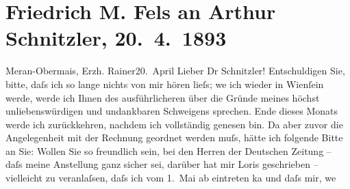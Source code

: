

               \section[Friedrich M. Fels an Arthur Schnitzler, 20. 4. 1893]{ Friedrich M. Fels an Arthur Schnitzler, 20. 4. 1893}\nopagebreak{}\rehead{ }\begin{ledgroupsized}[t]{13cm}\normalsize\beginnumbering{} \toendnotes[C]{\smallbreak\pagebreak[2]} 
\toendnotes[C]{\smallbreak}\pstart
           \raggedleft{}{\pb}Meran-Obermais, Erzh. Rainer20. April \label{K_L00198_1v}\label{K_L00198_1h}\pend
           \pstart\center{}Lieber Dr Schnitzler!\pend\pstart
           Entschuldigen Sie, bitte, daſs ich so lange nichts von mir hören lieſs; we{\geminationn} ich wieder in Wienſein werde, werde ich Ihnen des
                    ausführlicheren über die Gründe meines höchst unliebenswürdigen und undankbaren
                    Schweigens sprechen. Ende dieses Monats werde ich zurückkehren, nachdem ich
                    vollständig genesen bin. Da aber zuvor die Angelegenheit mit der Rechnung
                    geordnet werden muſs, hätte ich folgende Bitte an Sie: Wollen Sie so freundlich
                    sein, bei den Herren der Deutschen Zeitung –
                    daſs meine Anstellung ganz sicher sei, darüber hat mir Loris geschrieben – vielleicht zu veranlaſsen, daſs ich
                    vom 1. Mai ab eintreten ka{\geminationn} und  daſs mir, we{\geminationn}

\end{ledgroupsized}
